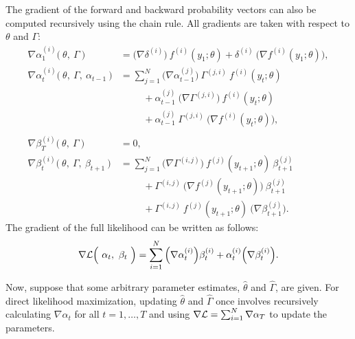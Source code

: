 The gradient of the forward and backward probability vectors can also be computed recursively using the chain rule. All gradients are taken with respect to $\theta$ and $\Gamma$:
%
\begin{align}
    \nabla \alpha_1^{(i)}\big(~\theta,~\Gamma~\big) &= \Big(\nabla \delta^{(i)}\Big)~ f^{(i)}(y_1;\theta) + \delta^{(i)} ~ \Big(\nabla f^{(i)}(y_1;\theta)\Big), \nonumber \\
    \nabla \alpha_{t}^{(i)}\big(~\theta,~\Gamma, ~\alpha_{t-1} ~\big) &= \sum_{j=1}^N \Big(\nabla \alpha_{t-1}^{(j)}\Big) ~ \Gamma^{(j,i)} ~ f^{(i)}(y_{t};\theta) \nonumber \\
    & \hspace{1cm} + \alpha_{t-1}^{(j)} ~ \Big(\nabla \Gamma^{(j,i)} \Big) ~ f^{(i)}(y_{t};\theta) \nonumber \\
    & \hspace{1cm} + \alpha_{t-1}^{(j)} ~ \Gamma^{(j,i)} ~ \Big(\nabla f^{(i)}(y_{t};\theta)\Big) \label{eqn:grad_alpha}, \\\nonumber\\
    \nabla \beta_T^{(i)}\big(~\theta,~\Gamma~\big) &= 0, \nonumber \\
    \nabla \beta_{t}^{(i)}\big(~\theta,~\Gamma, ~\beta_{t+1}~\big) &= \sum_{j=1}^N \Big(\nabla \Gamma^{(i,j)}\Big) ~ f^{(j)}(y_{t+1};\theta) ~ \beta_{t+1}^{(j)} \nonumber \\
    & \hspace{1cm} + \Gamma^{(i,j)} ~ \Big(\nabla f^{(j)}(y_{t+1};\theta)\Big) ~ \beta_{t+1}^{(j)} \nonumber \\
    & \hspace{1cm} + \Gamma^{(i,j)} ~ f^{(j)}(y_{t+1};\theta) ~ \Big(\nabla \beta_{t+1}^{(j)}\Big). \label{eqn:grad_beta}
\end{align}
%
The gradient of the full likelihood can be written as follows:
%
\begin{equation}
    \nabla \mathcal{L}\Big(~ \alpha_t , ~ \beta_t ~ \Big) = \sum_{i=1}^N \Big(\nabla \alpha_t^{(i)} \Big) \beta_t^{(i)} + \alpha_t^{(i)} \Big( \nabla \beta_t^{(i)} \Big).
    \label{eqn:grad_L}
\end{equation}

Now, suppose that some arbitrary parameter estimates, $\hat \theta$ and $\hat \Gamma$, are given. For direct likelihood maximization, updating $\hat \theta$ and $\hat \Gamma$ once involves recursively calculating $\nabla \alpha_t$ for all $t = 1,\ldots,T$ and using $\nabla \mathcal{L} = \sum_{i=1}^N \nabla \alpha_T$ to update the parameters. 

